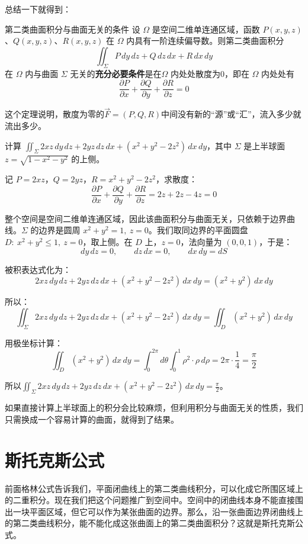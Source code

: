 总结一下就得到：

\begin{theorem}{第二类曲面积分与曲面无关的条件}{}
设 \(\Omega\) 是空间二维单连通区域，函数 \(P(x,y,z)\)、\(Q(x,y,z)\)、\(R(x,y,z)\) 在 \(\Omega\) 内具有一阶连续偏导数。则第二类曲面积分
\[
\iint_{\Sigma} P\,dy\,dz + Q\,dz\,dx + R\,dx\,dy
\]
在 \(\Omega\) 内与曲面 \(\Sigma\) 无关的\textbf{充分必要条件}是在\(\Omega\) 内处处散度为\(0\)，即在 \(\Omega\) 内处处有
\[
\frac{\partial P}{\partial x} + \frac{\partial Q}{\partial y} + \frac{\partial R}{\partial z} = 0
\]
\end{theorem}

这个定理说明，散度为零的\(\vec{F}=(P,Q,R)\)中间没有新的“源”或“汇”，流入多少就流出多少。

\begin{myexample}
计算 \(\iint_{\Sigma} 2xz\,dy\,dz + 2yz\,dz\,dx + (x^2+y^2-2z^2)\,dx\,dy\)，其中 \(\Sigma\) 是上半球面 \(z=\sqrt{1-x^2-y^2}\) 的上侧。

记 \(P=2xz\)，\(Q=2yz\)，\(R=x^2+y^2-2z^2\)，求散度：
\[
\frac{\partial P}{\partial x}+\frac{\partial Q}{\partial y}+\frac{\partial R}{\partial z}
= 2z+2z-4z = 0
\]

整个空间是空间二维单连通区域，因此该曲面积分与曲面无关，只依赖于边界曲线。\(\Sigma\) 的边界是圆周 \(x^2+y^2=1,\ z=0\)。我们取同边界的平面圆盘 \(D:\ x^2+y^2\le 1,\ z=0\)，取上侧。在 \(D\) 上，\(z=0\)，法向量为 \((0,0,1)\)，于是：
\[
dy\,dz=0,\qquad dz\,dx=0,\qquad dx\,dy=dS
\]

被积表达式化为：
\[
2xz\,dy\,dz + 2yz\,dz\,dx + (x^2+y^2-2z^2)\,dx\,dy
= (x^2+y^2)\,dx\,dy
\]

所以：
\[
\iint_{\Sigma} 2xz\,dy\,dz + 2yz\,dz\,dx + (x^2+y^2-2z^2)\,dx\,dy
= \iint_{D} (x^2+y^2)\,dx\,dy
\]

用极坐标计算：
\[
\iint_{D} (x^2+y^2)\,dx\,dy
= \int_0^{2\pi} d\theta \int_0^1 \rho^2\cdot \rho\,d\rho
= 2\pi \cdot \frac14 = \frac{\pi}{2}
\]

所以\(\iint_{\Sigma} 2xz\,dy\,dz + 2yz\,dz\,dx + (x^2+y^2-2z^2)\,dx\,dy = \frac{\pi}{2}\)。
\end{myexample}
如果直接计算上半球面上的积分会比较麻烦，但利用积分与曲面无关的性质，我们只需换成一个容易计算的曲面，就得到了结果。

\section{斯托克斯公式}
前面格林公式告诉我们，平面闭曲线上的第二类曲线积分，可以化成它所围区域上的二重积分。现在我们把这个问题推广到空间中。空间中的闭曲线本身不能直接围出一块平面区域，但它可以作为某张曲面的边界。那么，沿一张曲面边界闭曲线上的第二类曲线积分，能不能化成这张曲面上的第二类曲面积分？这就是斯托克斯公式。
